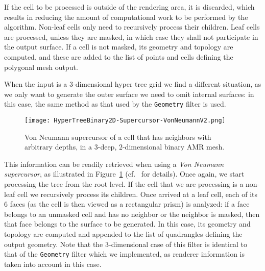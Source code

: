 If the cell to be processed is outside of the rendering
area, it is discarded, which results in reducing the amount of
computational work to be performed by the algorithm. 
Non-leaf cells only need to recursively process their children.
Leaf cells are processed, unless they are masked, in which case they
shall not participate in the output surface.
If a cell is not masked, its geometry and topology are computed, and
these are added to the list of points and cells defining the polygonal
mesh output.

When the input is a $3$-dimensional hyper tree grid we find a different
situation, as we only want to generate the outer surface we need to
omit internal surfaces: in this case, the same method as that used by
the \texttt{Geometry} filter is used.

\begin{figure}[ht!]
\centering
\begin{minipage}[t]{0.9\columnwidth}
\texttt{[image: HyperTreeBinary2D-Supercursor-VonNeumannV2.png]}
\end{minipage}
\caption{Von Neumann supercursor of a cell that has neighbors with
arbitrary depths, in a $3$-deep, $2$-dimensional binary AMR mesh.} 
\label{fig:HyperTreeBinary2D-SupercursorV2}
\end{figure}
This information can be readily retrieved when using a \emph{Von Neumann
supercursor}, as illustrated in
Figure~\ref{fig:HyperTreeBinary2D-SupercursorV2} (cf.~\cite{harel:17}
for details).
Once again, we start processing the tree from the root level. 
If the cell that we are processing is a non-leaf cell we recursively
process its children.
Once arrived at a leaf cell, each of its 6 faces (as the cell is then
viewed as a rectangular prism) is analyzed: if a face belongs
to an unmasked cell and has no neighbor or the neighbor is masked,
then that face belongs to the surface to be generated. 
In this case, its geometry and topology are computed and appended to
the list of quadrangles defining the output geometry.
Note that the $3$-dimensional case of this filter is identical to that
of the \texttt{Geometry} filter which we implemented, as renderer
information is taken into account in this case.

